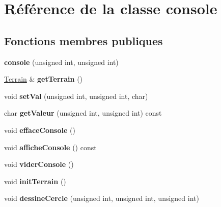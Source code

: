 \hypertarget{classconsole}{}\section{Référence de la classe console}
\label{classconsole}
\subsection*{Fonctions membres publiques}
\begin{DoxyCompactItemize}
\item 
\mbox{\label{classconsole_a0dba5aa3fefce7f6736760d8b37870e9}} 
{\bfseries console} (unsigned int, unsigned int)
\item 
\mbox{\label{classconsole_a1da28743992cd9ba022d4f60b11faa22}} 
\mbox{\hyperlink{class_terrain}{Terrain}} \& {\bfseries get\+Terrain} ()
\item 
\mbox{\label{classconsole_a7e419a6145be34548b8606e3a2a12f93}} 
void {\bfseries set\+Val} (unsigned int, unsigned int, char)
\item 
\mbox{\label{classconsole_a278463fd53034cc94cc42aad56de04f9}} 
char {\bfseries get\+Valeur} (unsigned int, unsigned int) const
\item 
\mbox{\label{classconsole_a41ac7c06bf6fa6b026bad02d2474a6a9}} 
void {\bfseries efface\+Console} ()
\item 
\mbox{\label{classconsole_a0e1432affdce243f6beaa8f2caaed50b}} 
void {\bfseries affiche\+Console} () const
\item 
\mbox{\label{classconsole_ad50e9280feccf065de319b2ff08de422}} 
void {\bfseries vider\+Console} ()
\item 
\mbox{\label{classconsole_af081be07a12839d86cd2ab2414f3997b}} 
void {\bfseries init\+Terrain} ()
\item 
\mbox{\label{classconsole_a104b101f4034b6a5517d744d9d581c31}} 
void {\bfseries dessine\+Cercle} (unsigned int, unsigned int, unsigned int)
\item 
\mbox{\label{classconsole_aec1386c61dd2efc8dc056da9d5c9ebb5}} 

\end{DoxyCompactItemize}
